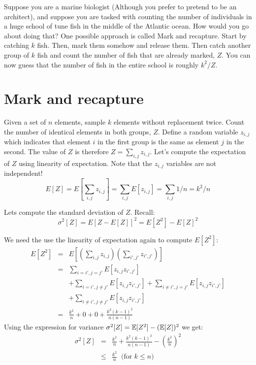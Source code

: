 \documentclass{article}
\begin{document}


Suppose you are a marine biologist (Although you prefer to pretend to be an architect), and
suppose you are tasked with counting the number of individuals in a huge school of tune fish in 
the middle of the Atlantic ocean. How would you go about doing that? 
One possible approach is called Mark and recapture.
Start by catching $k$ fish. Then, mark them somehow 
and release them. Then catch another group of $k$ fish and count the number of fish that are already marked, $Z$.
You can now guess that the number of fish in the entire school is roughly $k^2/Z$.

\section*{Mark and recapture}
Given a set of $n$ elements, sample $k$ elements without replacement twice.
Count the number of identical elements in both groups, $Z$.
Define a random variable $z_{i,j}$ which indicates that
element $i$ in the first group is the same as element $j$ in the second.
The value of $Z$ is therefore $Z = \sum_{i,j} z_{i,j}$.
Let's compute the expectation of $Z$ using linearity of expectation.
Note that the $z_{i,j}$ variables are not independent!
\begin{equation}
E[Z] = E[\sum_{i,j} z_{i,j}] = \sum_{i,j} E [z_{i,j}] = \sum_{i,j} 1/n = k^2/n
\end{equation}

\noindent Lets compute the standard deviation of $Z$. Recall:
$$\sigma^2[Z]  = E[Z-E[Z]]^2= E[Z^2] - E[Z]^2$$

\noindent  We need the use the linearity of expectation again to compute $E[Z^2]$:
\begin{eqnarray}
E[Z^2] &=& E[(\sum_{i,j} z_{i,j})(\sum_{i',j'} z_{i',j'})] \\ 
&=& \sum_{i=i',j=j'} E[z_{i,j}z_{i',j'}] \\
& & + \sum_{i=i', j \ne j'} E[z_{i,j}z_{i',j'}] +\sum_{i \ne i', j = j'} E[z_{i,j}z_{i',j'}]  \\
& & + \sum_{i \ne i', j \ne j'} E[z_{i,j}z_{i',j'}] \\
& = & \frac{k^2}{n} + 0 + 0 + \frac{k^2(k-1)^2}{n(n-1)} 
\end{eqnarray}
Using the expression for variance $\sigma^2[Z] = {\mathbb E}[Z^2] - ({\mathbb E}[Z])^2$ we get:
\begin{eqnarray}
\sigma^2[Z] &=& \frac{k^2}{n} + \frac{k^2(k-1)^2}{n(n-1)} - \left(\frac{k^2}{n}\right)^2 \\
&\le& \frac{k^2}{n}   \;\;\mbox{(for $k \le n$)}
\end{eqnarray}
\end{document}
